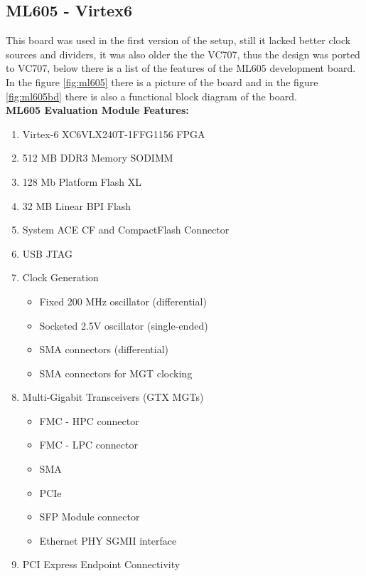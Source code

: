 \subsection{ML605 - Virtex6}
This board was used in the first version of the setup, still it lacked better
clock sources and dividers, it was also older the the VC707, thus the design was
ported to VC707, below there is a list of the features of the ML605 development
board.\\

In the figure \ref{fig:ml605} there is a picture of the board and in the figure
\ref{fig:ml605bd} there is also a functional block diagram of the board.\\

\textbf{ML605 Evaluation Module Features:}
\begin{enumerate}
  \item Virtex-6 XC6VLX240T-1FFG1156 FPGA
  \item 512 MB DDR3 Memory SODIMM
  \item 128 Mb Platform Flash XL
  \item 32 MB Linear BPI Flash
  \item System ACE CF and CompactFlash Connector
  \item USB JTAG
  \item Clock Generation
  \begin{itemize}
    \item Fixed 200 MHz oscillator (differential)
    \item Socketed 2.5V oscillator (single-ended)
    \item SMA connectors (differential)
    \item SMA connectors for MGT clocking
  \end{itemize}

  \item Multi-Gigabit Transceivers (GTX MGTs)

  \begin{itemize}
    \item FMC - HPC connector
    \item FMC - LPC connector
    \item SMA
    \item PCIe
    \item SFP Module connector
    \item Ethernet PHY SGMII interface
  \end{itemize}

  \item PCI Express Endpoint Connectivity


\end{enumerate}
